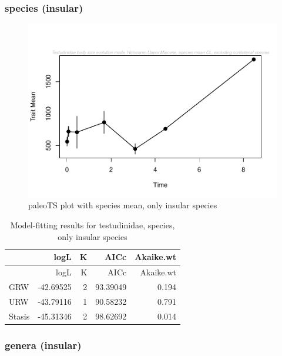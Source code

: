 \documentclass[]{article}
\begin{document}
\newpage

\subsubsection{species (insular)}\label{species-insular}

\begin{figure}[htbp]
\centering
\includegraphics{MA_JJ_files/figure-latex/paleoTS plot with species mean, excluding continental species-1.pdf}
\caption{paleoTS plot with species mean, only insular species}
\end{figure}

\begin{longtable}[]{@{}lrrrr@{}}
\caption{Model-fitting results for testudinidae, species, only insular
species}\tabularnewline
\toprule
& logL & K & AICc & Akaike.wt\tabularnewline
\midrule
\endfirsthead
\toprule
& logL & K & AICc & Akaike.wt\tabularnewline
\midrule
\endhead
GRW & -42.69525 & 2 & 93.39049 & 0.194\tabularnewline
URW & -43.79116 & 1 & 90.58232 & 0.791\tabularnewline
Stasis & -45.31346 & 2 & 98.62692 & 0.014\tabularnewline
\bottomrule
\end{longtable}

\newpage

\subsubsection{genera (insular)}\label{genera-insular}
\end{document}
